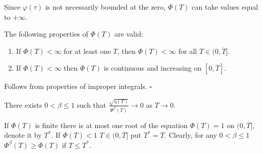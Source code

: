 \documentclass[../main.tex]{subfiles}
\begin{document}
Since $ \varphi(\tau) $ is not necessarily bounded at the zero, $\Phi(T)$ can take values equal to $+\infty$. 
\begin{lemma}%
The following properties of $\Phi(T)$ are valid:
\begin{enumerate}
 \item If $\Phi(T) < \infty $ for at least one $T$, then $\Phi(T) < \infty $ for all $T \in (0, \overline{T}]$.
\item If $\Phi(T) < \infty $ then $\Phi(T)$ is continuous and increasing on  $ [0,\overline{T}]$.
 \end{enumerate}
\end{lemma}
\doc Follows from  properties of improper integrals.
	\hfill $ \square $
\begin{assumption}\label{asm2}
There exists $ 0 < \beta \leqslant 1$ such that $\frac{\sqrt{\eta(T)}}{\Phi^\beta(T)} \to 0$ as $T \to 0$.
\end{assumption}
If $\Phi(T)$ is finite there is at most one root of the equation $\Phi(T)=1$ on $(0,\overline{T}]$,  denote it by $T^*$.  If $\Phi(T)<1$  $T\in (0,\overline{T}]$ put $T^*=\overline{T}$. Clearly, for any  $ 0 < \beta \leqslant 1$  $\Phi^\beta(T)\geqslant \Phi(T)$ if $T \leqslant T^*$.
\end{document}
